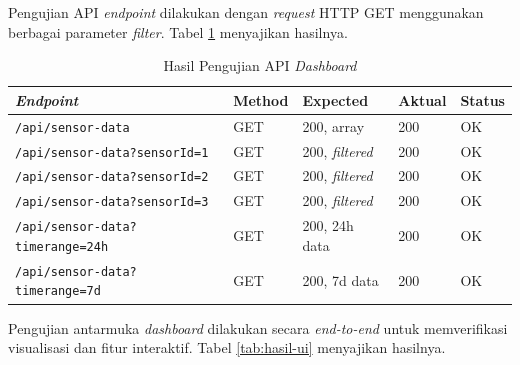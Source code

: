 Pengujian API \textit{endpoint} dilakukan dengan \textit{request} HTTP GET menggunakan berbagai parameter \textit{filter}. Tabel \ref{tab:hasil-api} menyajikan hasilnya.

\begin{table}[H]
  \caption{Hasil Pengujian API \textit{Dashboard}}
  \label{tab:hasil-api}
  \begin{tabularx}{\textwidth}{| X | l | l | l | l |}
    \hline
    \textbf{\textit{Endpoint}} & \textbf{Method} & \textbf{Expected} & \textbf{Aktual} & \textbf{Status} \\
    \hline
    \texttt{/api/sensor-data}                   & GET & 200, array             & 200 & OK \\
    \hline
    \texttt{/api/sensor-data?sensorId=1}        & GET & 200, \textit{filtered} & 200 & OK \\
    \hline
    \texttt{/api/sensor-data?sensorId=2}        & GET & 200, \textit{filtered} & 200 & OK \\
    \hline
    \texttt{/api/sensor-data?sensorId=3}        & GET & 200, \textit{filtered} & 200 & OK \\
    \hline
    \texttt{/api/sensor-data?timerange=24h}     & GET & 200, 24h data          & 200 & OK \\
    \hline
    \texttt{/api/sensor-data?timerange=7d}      & GET & 200, 7d data           & 200 & OK \\
    \hline
  \end{tabularx}
\end{table}

Pengujian antarmuka \textit{dashboard} dilakukan secara \textit{end-to-end} untuk memverifikasi visualisasi dan fitur interaktif. Tabel \ref{tab:hasil-ui} menyajikan hasilnya.

